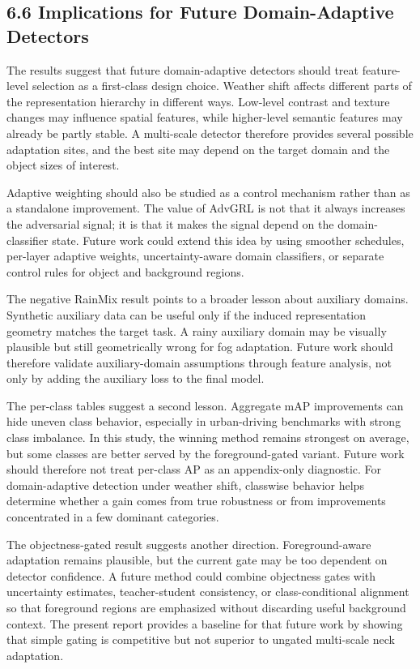 \documentclass[
  11pt,
]{article}
\begin{document}
\hypertarget{implications-for-future-domain-adaptive-detectors}{%
\subsection{6.6 Implications for Future Domain-Adaptive
Detectors}\label{implications-for-future-domain-adaptive-detectors}}

The results suggest that future domain-adaptive detectors should treat
feature-level selection as a first-class design choice. Weather shift
affects different parts of the representation hierarchy in different
ways. Low-level contrast and texture changes may influence spatial
features, while higher-level semantic features may already be partly
stable. A multi-scale detector therefore provides several possible
adaptation sites, and the best site may depend on the target domain and
the object sizes of interest.

Adaptive weighting should also be studied as a control mechanism rather
than as a standalone improvement. The value of AdvGRL is not that it
always increases the adversarial signal; it is that it makes the signal
depend on the domain-classifier state. Future work could extend this
idea by using smoother schedules, per-layer adaptive weights,
uncertainty-aware domain classifiers, or separate control rules for
object and background regions.

The negative RainMix result points to a broader lesson about auxiliary
domains. Synthetic auxiliary data can be useful only if the induced
representation geometry matches the target task. A rainy auxiliary
domain may be visually plausible but still geometrically wrong for fog
adaptation. Future work should therefore validate auxiliary-domain
assumptions through feature analysis, not only by adding the auxiliary
loss to the final model.

The per-class tables suggest a second lesson. Aggregate mAP improvements
can hide uneven class behavior, especially in urban-driving benchmarks
with strong class imbalance. In this study, the winning method remains
strongest on average, but some classes are better served by the
foreground-gated variant. Future work should therefore not treat
per-class AP as an appendix-only diagnostic. For domain-adaptive
detection under weather shift, classwise behavior helps determine
whether a gain comes from true robustness or from improvements
concentrated in a few dominant categories.

The objectness-gated result suggests another direction. Foreground-aware
adaptation remains plausible, but the current gate may be too dependent
on detector confidence. A future method could combine objectness gates
with uncertainty estimates, teacher-student consistency, or
class-conditional alignment so that foreground regions are emphasized
without discarding useful background context. The present report
provides a baseline for that future work by showing that simple gating
is competitive but not superior to ungated multi-scale neck adaptation.
\end{document}
